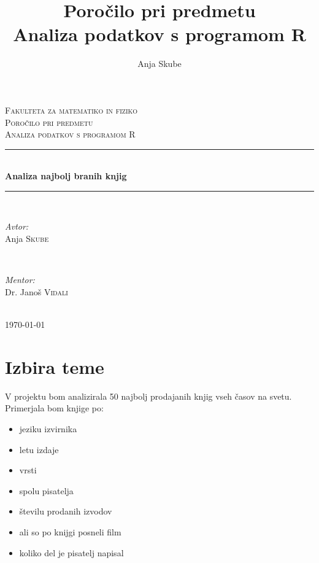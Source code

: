 \documentclass[11pt,a4paper]{article}
\begin{document}
\begin{titlepage}
\newcommand{\HRule}{\rule{\linewidth}{0.5mm}}
\center
\textsc{\LARGE Fakulteta za matematiko in fiziko}\\[3 cm]
\textsc{\Large Poročilo pri predmetu}\\[0.5cm]
\textsc{\large Analiza podatkov s programom R}\\[2 cm]
\HRule \\[0.4cm]
{ \huge \bfseries Analiza najbolj branih knjig}\\[0.4cm]
\HRule \\[6 cm]
\begin{minipage}{0.4\textwidth}
\begin{flushleft} \large
\emph{Avtor:}\\
Anja \textsc{Skube}
\end{flushleft}
\end{minipage}
~
\begin{minipage}{0.4\textwidth}
\begin{flushright} \large
\emph{Mentor:} \\
Dr. Janoš \textsc{Vidali}
\end{flushright}
\end{minipage}\\[2 cm]
{\large \today}\\[3cm]
\end{titlepage}


\title{Poročilo pri predmetu \\
Analiza podatkov s programom R}
\author{Anja Skube}
\maketitle

\section{Izbira teme}

V projektu bom analizirala 50 najbolj prodajanih knjig vseh časov na svetu. Primerjala bom knjige po:

\begin{itemize}
\item jeziku izvirnika
\item letu izdaje
\item vrsti
\item spolu pisatelja
\item številu prodanih izvodov
\item ali so po knijgi posneli film
\item koliko del je pisatelj napisal
\end{itemize}
\end{document}
